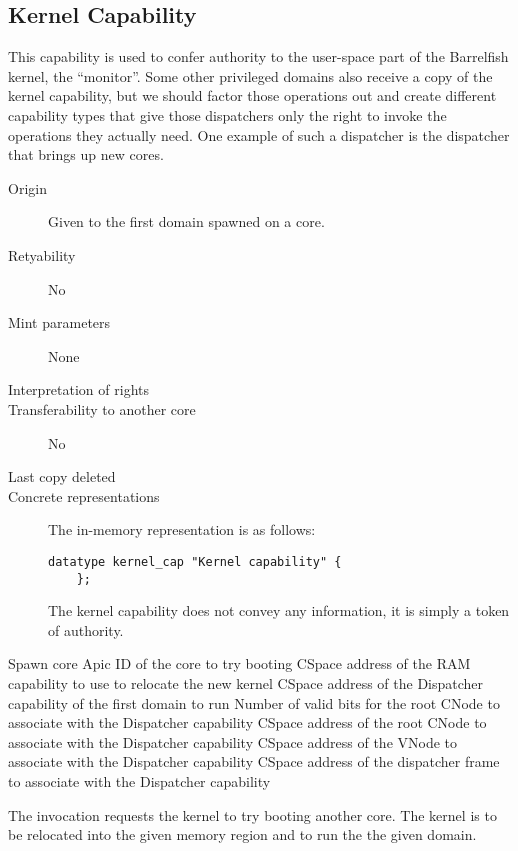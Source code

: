 \subsection{Kernel Capability}
This capability is used to confer authority to the user-space part of the
Barrelfish kernel, the ``monitor''.
Some other privileged domains also receive a copy of the kernel capability,
but we should factor those operations out and create different capability
types that give those dispatchers only the right to invoke the operations they
actually need.
One example of such a dispatcher is the dispatcher that brings up new cores.

\begin{description}
\item[Origin] Given to the first domain spawned on a core.
  
\item[Retyability] No
  
\item[Mint parameters] None
  
\item[Interpretation of rights] 
  
\item[Transferability to another core] No

\item[Last copy deleted] 
  
\item[Concrete representations] The in-memory representation is as follows:
  
  \begin{lstlisting}[language=Mackerel]
    datatype kernel_cap "Kernel capability" {
    };
  \end{lstlisting}

    The kernel capability does not convey any information, it is simply a
    token of authority.
\end{description}

\begin{invocation}{Spawn core}
  \arg Apic ID of the core to try booting
  \arg CSpace address of the RAM capability to use to relocate the new kernel
  \arg CSpace address of the Dispatcher capability of the first domain to run
  \arg Number of valid bits for the root CNode to associate with the Dispatcher capability
  \arg CSpace address of the root CNode to associate with the Dispatcher capability
  \arg CSpace address of the VNode to associate with the Dispatcher capability
  \arg CSpace address of the dispatcher frame to associate with the Dispatcher capability
\end{invocation}
The invocation requests the kernel to try booting another core.  The
kernel is to be relocated into the given memory region and to run the
the given domain.

